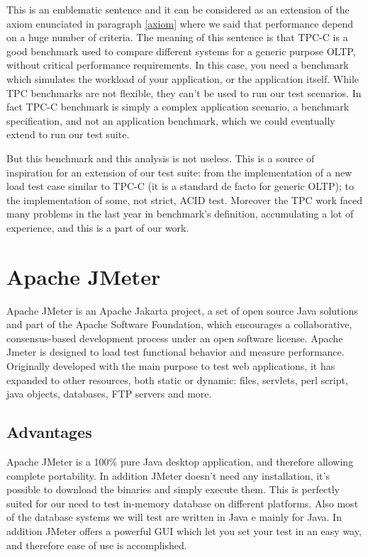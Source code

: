 This is an emblematic sentence and it can be considered as an extension of the axiom enunciated in paragraph \ref{axiom} where we said that performance depend on a huge number of criteria. The meaning of this sentence is that TPC-C is a good benchmark used to compare different systems for a generic purpose OLTP, without critical performance requirements. In this case, you need a benchmark which simulates the workload of your application, or the application itself. While TPC benchmarks are not flexible, they can't be used to run our test scenarios. In fact TPC-C benchmark is simply a complex application scenario, a benchmark specification, and not an application benchmark, which we could eventually extend to run our test suite.

But this benchmark and this analysis is not useless. This is a source of inspiration for an extension of our test suite: from the implementation of a new load test case similar to TPC-C (it is a standard de facto for generic OLTP); to the implementation of some, not strict, ACID test. Moreover the TPC work faced many problems in the last year in benchmark's definition, accumulating a lot of experience, and this is a part of our work.
	
	\section{Apache JMeter}
Apache JMeter is an Apache Jakarta project, a set of open source Java solutions and part of the Apache Software Foundation, which encourages a collaborative, consensus-based development process under an open software license. Apache Jmeter is designed to load test functional behavior and measure performance. Originally developed with the main purpose to test web applications, it has expanded to other resources, both static or dynamic: files, servlets, perl script, java objects, databases, FTP servers and more.

		\subsection{Advantages}
Apache JMeter is a 100\% pure Java desktop application, and therefore allowing complete portability. In addition JMeter doesn't need any installation, it's possible to download the binaries and simply execute them. This is perfectly suited for our need to test in-memory database on different platforms. Also most of the database systems we will test are written in Java e mainly for Java. In addition JMeter offers a powerful GUI which let you set your test in an easy way, and therefore ease of use is accomplished.

